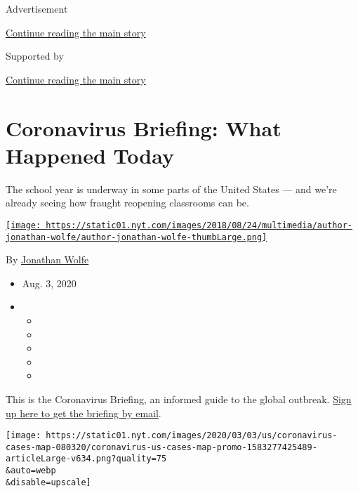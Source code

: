 Advertisement

\protect\hyperlink{after-top}{Continue reading the main story}

Supported by

\protect\hyperlink{after-sponsor}{Continue reading the main story}

\hypertarget{coronavirus-briefing-what-happened-today}{%
\section{Coronavirus Briefing: What Happened
Today}\label{coronavirus-briefing-what-happened-today}}

The school year is underway in some parts of the United States --- and
we're already seeing how fraught reopening classrooms can be.

\href{https://www.nytimes.com/by/jonathan-wolfe}{\texttt{[image: https://static01.nyt.com/images/2018/08/24/multimedia/author-jonathan-wolfe/author-jonathan-wolfe-thumbLarge.png]}}

By \href{https://www.nytimes.com/by/jonathan-wolfe}{Jonathan Wolfe}

\begin{itemize}
\item
  Aug. 3, 2020
\item
  \begin{itemize}
  \item
  \item
  \item
  \item
  \item
  \end{itemize}
\end{itemize}

This is the Coronavirus Briefing, an informed guide to the global
outbreak.
\href{https://www.nytimes.com/newsletters/coronavirus-briefing}{Sign up
here to get the briefing by email}.

\texttt{[image: https://static01.nyt.com/images/2020/03/03/us/coronavirus-cases-map-080320/coronavirus-us-cases-map-promo-1583277425489-articleLarge-v634.png?quality=75\\\&auto=webp\\\&disable=upscale]}

